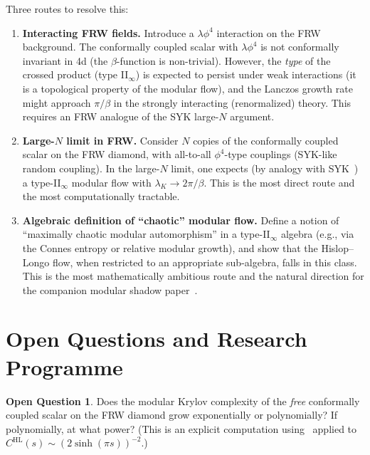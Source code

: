 \documentclass[12pt,a4paper]{article}
\theoremstyle{definition}
\newtheorem{question}[theorem]{Open Question}
\newcommand{\lK}{\lambda_K}
\newcommand{\HL}{\mathrm{HL}}
\begin{document}
Three routes to resolve this:
\begin{enumerate}
\item[(R1)] \textbf{Interacting FRW fields.}
  Introduce a $\lambda\phi^4$ interaction on the FRW background.
  The conformally coupled scalar with $\lambda\phi^4$ is not conformally
  invariant in 4d (the $\beta$-function is non-trivial).
  However, the \emph{type} of the crossed product (type II$_\infty$)
  is expected to persist under weak interactions (it is a topological
  property of the modular flow), and the Lanczos growth rate might
  approach $\pi/\beta$ in the strongly interacting (renormalized) theory.
  This requires an FRW analogue of the SYK large-$N$ argument.

\item[(R2)] \textbf{Large-$N$ limit in FRW.}
  Consider $N$ copies of the conformally coupled scalar on the FRW
  diamond, with all-to-all $\phi^4$-type couplings (SYK-like random
  coupling).
  In the large-$N$ limit, one expects (by analogy with SYK~\cite{SYK_Kitaev})
  a type-II$_\infty$ modular flow with $\lK \to 2\pi/\beta$.
  This is the most direct route and the most computationally tractable.

\item[(R3)] \textbf{Algebraic definition of ``chaotic'' modular flow.}
  Define a notion of ``maximally chaotic modular automorphism'' in
  a type-II$_\infty$ algebra (e.g., via the Connes entropy or relative
  modular growth), and show that the Hislop--Longo flow, when restricted
  to an appropriate sub-algebra, falls in this class.
  This is the most mathematically ambitious route and the natural
  direction for the companion modular shadow paper~\cite{ModularShadow}.
\end{enumerate}

\section{Open Questions and Research Programme}
\label{sec:open}

\begin{question}\label{q:free-vs-interacting}
  Does the modular Krylov complexity of the \emph{free} conformally
  coupled scalar on the FRW diamond grow exponentially or polynomially?
  If polynomially, at what power?
  (This is an explicit computation using~\cite{Parker2019}
  applied to $C^\HL(s) \sim (2\sinh(\pi s))^{-2}$.)
\end{question}
\end{document}
